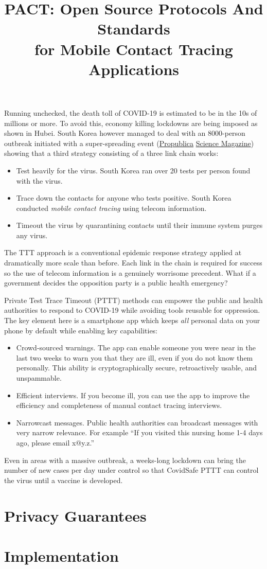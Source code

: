 \documentclass{article}
\title{{\huge PACT\/}: Open Source {\Huge P\/}rotocols {\Huge A\/}nd Standards \\
for Mobile {\Huge C\/}ontact {\Huge T\/}racing Applications}
\date{}
\begin{document}
\maketitle

Running unchecked, the death toll of COVID-19 is estimated to be in the 10s of millions or more.  To avoid this, economy killing lockdowns are being imposed as shown in Hubei.  South Korea however managed to deal with an 8000-person outbreak initiated with a super-spreading event (\href{https://www.propublica.org/article/how-south-korea-scaled-coronavirus-testing-while-the-us-fell-dangerously-behind}{Propublica} \href{https://www.sciencemag.org/news/2020/03/coronavirus-cases-have-dropped-sharply-south-korea-whats-secret-its-success}{Science Magazine}) showing that a third strategy consisting of a three link chain works:
\begin{itemize}
\item Test heavily for the virus.  South Korea ran over 20 tests per person found with the virus. 
\item Trace down the contacts for anyone who tests positive.  South Korea conducted \emph{mobile contact tracing} using telecom information.
\item Timeout the virus by quarantining contacts until their immune system purges any virus.
\end{itemize}
The TTT approach is a conventional epidemic response strategy applied
at dramatically more scale than before.  Each link in the chain is
required for success so the use of telecom information is a genuinely
worrisome precedent.  What if a government decides the opposition
party is a public health emergency?

Private Test Trace Timeout (PTTT) methods can empower the public and
health authorities to respond to COVID-19 while avoiding tools
reusable for oppression.  The key element here is a smartphone app
which keeps \emph{all} personal data on your phone by default while
enabling key capabilities:
\begin{itemize}
\item Crowd-sourced warnings.  The app can enable someone you were near in the last two weeks to warn you that they are ill, even if you do not know them personally.  This ability is cryptographically secure, retroactively usable, and unspammable. 
\item Efficient interviews.  If you become ill, you can use the app to improve the efficiency and completeness of manual contact tracing interviews.
\item Narrowcast messages.  Public health authorities can broadcast messages with very narrow relevance.  For example ``If you visited this nursing home 1-4 days ago, please email x@y.z.''
\end{itemize}
Even in areas with a massive outbreak, a weeks-long lockdown can bring the number of new cases per day under control so that CovidSafe PTTT can control the virus until a vaccine is developed.

\section{Privacy Guarantees}

\section{Implementation}
\end{document}

